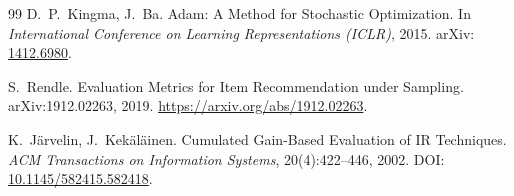 \begin{thebibliography}{99}
D.~P.~Kingma, J.~Ba.
\newblock Adam: A Method for Stochastic Optimization.
\newblock In \emph{International Conference on Learning Representations (ICLR)}, 2015.
\newblock arXiv: \href{https://arxiv.org/abs/1412.6980}{1412.6980}.

S.~Rendle.
\newblock Evaluation Metrics for Item Recommendation under Sampling.
\newblock arXiv:1912.02263, 2019.
\newblock \url{https://arxiv.org/abs/1912.02263}.

K.~Järvelin, J.~Kekäläinen.
\newblock Cumulated Gain-Based Evaluation of IR Techniques.
\newblock \emph{ACM Transactions on Information Systems}, 20(4):422--446, 2002.
\newblock DOI: \href{https://doi.org/10.1145/582415.582418}{10.1145/582415.582418}.

\end{thebibliography}
